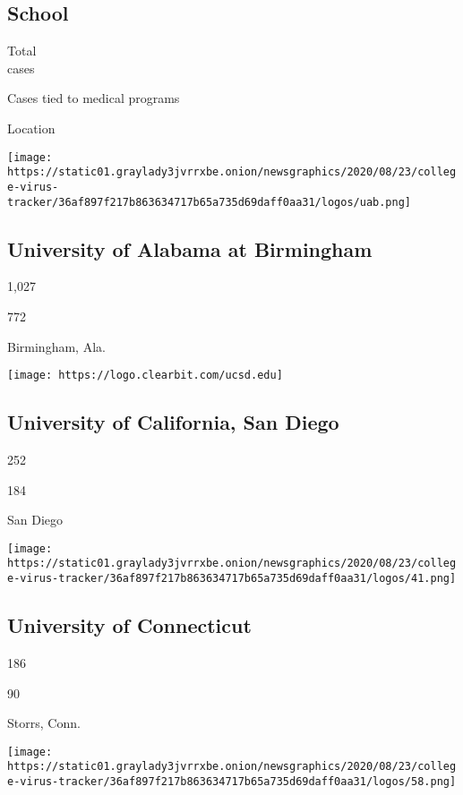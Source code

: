 \hypertarget{school}{%
\subsection{School}\label{school}}

Total\\
cases

Cases tied to medical programs

Location

\texttt{[image: https://static01.graylady3jvrrxbe.onion/newsgraphics/2020/08/23/college-virus-tracker/36af897f217b863634717b65a735d69daff0aa31/logos/uab.png]}

\hypertarget{university-of-alabama-at-birmingham}{%
\subsection{University of Alabama at
Birmingham}\label{university-of-alabama-at-birmingham}}

1,027

772

Birmingham, Ala.

\texttt{[image: https://logo.clearbit.com/ucsd.edu]}

\hypertarget{university-of-california-san-diego}{%
\subsection{University of California, San
Diego}\label{university-of-california-san-diego}}

252

184

San Diego

\texttt{[image: https://static01.graylady3jvrrxbe.onion/newsgraphics/2020/08/23/college-virus-tracker/36af897f217b863634717b65a735d69daff0aa31/logos/41.png]}

\hypertarget{university-of-connecticut}{%
\subsection{University of Connecticut}\label{university-of-connecticut}}

186

90

Storrs, Conn.

\texttt{[image: https://static01.graylady3jvrrxbe.onion/newsgraphics/2020/08/23/college-virus-tracker/36af897f217b863634717b65a735d69daff0aa31/logos/58.png]}

